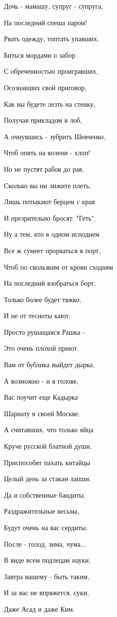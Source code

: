 Дочь - мамашу, супруг - супруга,

На последний спеша паром!

Рвать одежду, топтать упавших,

Биться мордами о забор

С обреченностью проигравших,

Осознавших свой приговор,

Как вы будете лезть на стенку,

Получая прикладом в лоб,

А очнувшись - зубрить Шевченко,

Чтоб опять на колени - хлоп!

Но не пустят рабов до рая,

Сколько вы ни лижите плеть,

Лишь потыкают берцем с края

И презрительно бросят: "Геть".

Ну а тем, кто в одном исподнем

Все ж сумеет прорваться в порт,

Чтоб по скользким от крови сходням

На последний взобраться борт,

Только более будет тяжко,

И не от тесноты кают,

Просто рушащаяся Рашка -

Это очень плохой приют.

Вам от бублика выйдет дырка,

А возможно - и в голове,

Вас поучит еще Кадырка

Шариату в своей Москве.

А считавших, что только яйца

Круче русской блатной души,

Приспособят пахать китайцы

Целый день за стакан лапши.

Да и собственные бандиты,

Раздражительные весьма,

Будут очень на вас сердиты.

После - голод, зима, чума...

В виде всем подлецам науки,

Завтра вашему - быть таким,

И за вас не впряжется, суки,

Даже Асад и даже Ким.

